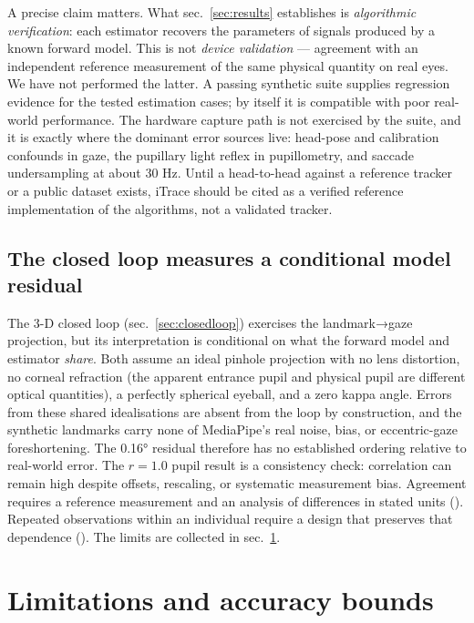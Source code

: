 \documentclass[
]{article}
\newcounter{none} %
\begin{document}
A precise claim matters. What sec.~\ref{sec:results} establishes is
\emph{algorithmic verification}: each estimator recovers the parameters
of signals produced by a known forward model. This is not \emph{device
validation} --- agreement with an independent reference measurement of
the same physical quantity on real eyes. We have not performed the
latter. A passing synthetic suite supplies regression evidence for the
tested estimation cases; by itself it is compatible with poor real-world
performance. The hardware capture path is not exercised by the suite,
and it is exactly where the dominant error sources live: head-pose and
calibration confounds in gaze, the pupillary light reflex in
pupillometry, and saccade undersampling at about 30 Hz. Until a
head-to-head against a reference tracker or a public dataset exists,
iTrace should be cited as a verified reference implementation of the
algorithms, not a validated tracker.

\subsection{The closed loop measures a conditional model
residual}\label{the-closed-loop-measures-a-conditional-model-residual}

The 3-D closed loop (sec.~\ref{sec:closedloop}) exercises the
landmark→gaze projection, but its interpretation is conditional on what
the forward model and estimator \emph{share}. Both assume an ideal
pinhole projection with no lens distortion, no corneal refraction (the
apparent entrance pupil and physical pupil are different optical
quantities), a perfectly spherical eyeball, and a zero kappa angle.
Errors from these shared idealisations are absent from the loop by
construction, and the synthetic landmarks carry none of MediaPipe's real
noise, bias, or eccentric-gaze foreshortening. The 0.16° residual
therefore has no established ordering relative to real-world error. The
\(r = 1.0\) pupil result is a consistency check: correlation can remain
high despite offsets, rescaling, or systematic measurement bias.
Agreement requires a reference measurement and an analysis of
differences in stated units (). Repeated observations within an individual require a
design that preserves that dependence
(). The limits
are collected in sec.~\ref{sec:limitations}.

\section{Limitations and accuracy bounds}\label{sec:limitations}
\end{document}
